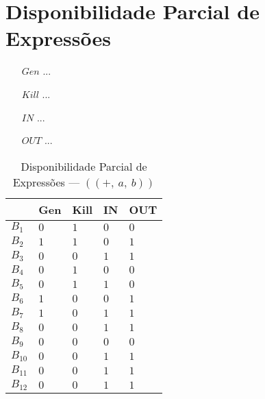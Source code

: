 \section{Disponibilidade Parcial de Express\~oes}

\begin{itemize}
  \item[$Gen$] ...
  \item[$Kill$] ...
  \item[$IN$] ...
  \item[$OUT$] ...
\end{itemize}

\begin{table}[ht]
\centering
\begin{tabular}{l|l|l|l|l}
	& Gen & Kill & IN & OUT\\
\hline
$B_{1}$ &  $0$ & $1$ & $0$ & $0$\\
$B_{2}$ &  $1$ & $1$ & $0$ & $1$\\
$B_{3}$ &  $0$ & $0$ & $1$ & $1$\\
$B_{4}$ &  $0$ & $1$ & $0$ & $0$\\
$B_{5}$ &  $0$ & $1$ & $1$ & $0$\\
$B_{6}$ &  $1$ & $0$ & $0$ & $1$\\
$B_{7}$ &  $1$ & $0$ & $1$ & $1$\\
$B_{8}$ &  $0$ & $0$ & $1$ & $1$\\
$B_{9}$ &  $0$ & $0$ & $0$ & $0$\\
$B_{10}$ &  $0$ & $0$ & $1$ & $1$\\
$B_{11}$ &  $0$ & $0$ & $1$ & $1$\\
$B_{12}$ &  $0$ & $0$ & $1$ & $1$\\
\end{tabular}
\caption{Disponibilidade Parcial de Express\~oes --- $((+,\:a,\:b))$}
\end{table}

